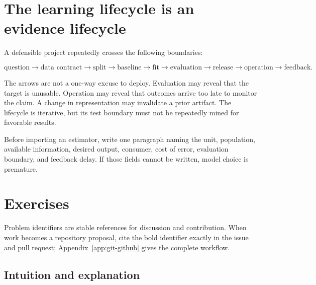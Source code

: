 \section{The learning lifecycle is an evidence lifecycle}

A defensible project repeatedly crosses the following boundaries:

\[
\text{question}\rightarrow\text{data contract}\rightarrow\text{split}
\rightarrow\text{baseline}\rightarrow\text{fit}\rightarrow\text{evaluation}
\rightarrow\text{release}\rightarrow\text{operation}\rightarrow\text{feedback}.
\]

The arrows are not a one-way excuse to deploy. Evaluation may reveal that the
target is unusable. Operation may reveal that outcomes arrive too late to
monitor the claim. A change in representation may invalidate a prior artifact.
The lifecycle is iterative, but its test boundary must not be repeatedly mined
for favorable results.

\begin{professionalbox}
Before importing an estimator, write one paragraph naming the unit, population,
available information, desired output, consumer, cost of error, evaluation
boundary, and feedback delay. If those fields cannot be written, model choice is
premature.
\end{professionalbox}

\section{Exercises}

Problem identifiers are stable references for discussion and contribution.
When work becomes a repository proposal, cite the bold identifier exactly in
the issue and pull request; Appendix~\ref{app:git-github} gives the complete
workflow.

\subsection*{Intuition and explanation}

